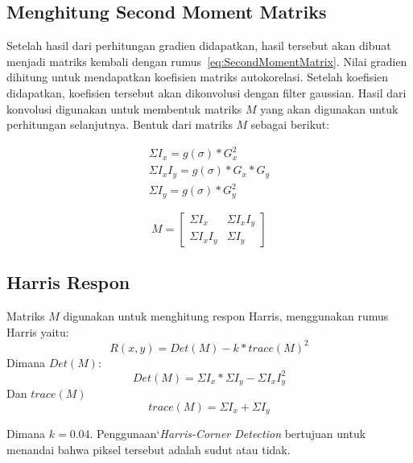 \subsection{Menghitung Second Moment Matriks}
    Setelah hasil dari perhitungan gradien didapatkan, hasil tersebut akan dibuat menjadi matriks kembali dengan rumus~\eqref{eq:SecondMomentMatrix}. Nilai gradien dihitung untuk mendapatkan koefisien matriks autokorelasi. Setelah koefisien didapatkan, koefisien tersebut akan dikonvolusi dengan filter gaussian.
Hasil dari konvolusi digunakan untuk membentuk matriks \(M\) yang akan digunakan untuk perhitungan selanjutnya. Bentuk dari matriks \(M\) sebagai berikut:

\begin{equation*}
    \begin{aligned}
        \Sigma I_{x} = g(\sigma) * G_{x}^2 \\
        \Sigma I_{x}I_{y} = g(\sigma) * G_{x} * G_{y} \\
        \Sigma I_{y} = g(\sigma) * G_{y}^2
    \end{aligned}
\end{equation*}

\begin{equation}
    M = 
    \begin{bmatrix}
        \Sigma I_{x} & \Sigma I_{x}I_{y} \\
        \Sigma I_{x}I_{y} & \Sigma I_{y}
    \end{bmatrix} 
\end{equation}

\subsection{Harris Respon}
    Matriks \(M\) digunakan untuk menghitung respon Harris, menggunakan rumus Harris yaitu:
\begin{equation}
    R(x,y) = Det(M) - k * {trace(M)}^2
\end{equation}
Dimana \(Det(M)\):
\begin{equation*}
    Det(M) = \Sigma I_{x} * \Sigma I_{y} - \Sigma I_{x}I_{y}^2
\end{equation*}
Dan \(trace(M)\) 
\begin{equation*}
    trace(M) = \Sigma I_{x} + \Sigma I_{y}
\end{equation*}

    Dimana \(k = 0.04\). Penggunaan`\emph{Harris-Corner Detection} bertujuan untuk menandai bahwa piksel tersebut adalah sudut atau tidak.

